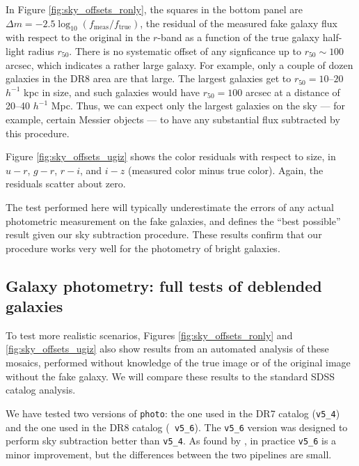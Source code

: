 \documentclass[10pt,preprint]{aastex}
\begin{document}
In Figure \ref{fig:sky_offsets_ronly}, the squares in the bottom panel
are $\Delta m = -2.5\log_{10}(f_{\mathrm{meas}}/f_{\mathrm{true}})$,
the residual of the measured fake galaxy flux with respect to the
original in the $r$-band as a function of the true galaxy half-light
radius $r_{50}$.  There is no systematic offset of any signficance up
to $r_{50} \sim 100$ arcsec, which indicates a rather large galaxy.
For example, only a couple of dozen galaxies in the DR8 area are that
large. The largest galaxies get to $r_{50}= 10$--$20$ $h^{-1}$ kpc in
size, and such galaxies would have $r_{50} = 100$ arcsec at a distance
of 20--40 $h^{-1}$ Mpc. Thus, we can expect only the largest galaxies
on the sky --- for example, certain Messier objects --- to have any
substantial flux subtracted by this procedure.

Figure \ref{fig:sky_offsets_ugiz} shows the color residuals with
respect to size, in $u-r$, $g-r$, $r-i$, and $i-z$ (measured color
minus true color). Again, the residuals scatter about zero.

The test performed here will typically underestimate the errors of any
actual photometric measurement on the fake galaxies, and defines the
``best possible'' result given our sky subtraction procedure. These
results confirm that our procedure works very well for the photometry
of bright galaxies.

\subsection{Galaxy photometry: full tests of deblended galaxies}
\label{sec:deblendgal}

To test more realistic scenarios, Figures \ref{fig:sky_offsets_ronly}
and \ref{fig:sky_offsets_ugiz} also show results from an automated
analysis of these mosaics, performed without knowledge of the true
image or of the original image without the fake galaxy. We will
compare these results to the standard SDSS catalog analysis.

We have tested two versions of {\tt photo}: the one used in the DR7
catalog ({\tt v5\_4}) and the one used in the DR8 catalog ({\tt
  v5\_6}). The {\tt v5\_6} version was designed to perform sky
subtraction better than {\tt v5\_4}.  As found by \citet{aihara11a},
in practice {\tt v5\_6} is a minor improvement, but the differences
between the two pipelines are small.
\end{document}
